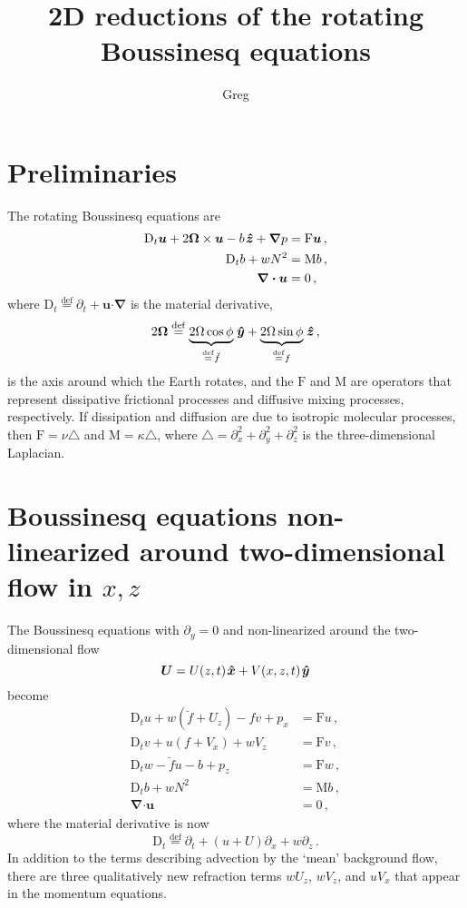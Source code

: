 \documentclass[12pt, oneside]{article}
\newcommand{\com}{\, ,}
\newcommand{\per}{\, .}
\newcommand{\defn}{\ensuremath{\stackrel{\mathrm{def}}{=}}}
\newcommand{\beq}{\begin{equation}}
\newcommand{\eeq}{\end{equation}}
\newcommand{\p}{\partial}
\newcommand{\bnabla}{\boldsymbol \nabla}
\newcommand{\bcdot}{\boldsymbol \cdot}
\newcommand{\lap}{\triangle}
\newcommand{\bu}{\boldsymbol u}
\newcommand{\bxh}{\hspace{0.1em} \boldsymbol{\hat x}}
\newcommand{\byh}{\hspace{0.1em}\boldsymbol{\hat y}}
\newcommand{\bzh}{\hspace{0.1em}\boldsymbol{\hat z}}
\newcommand{\bOmega}{\boldsymbol \Omega}
\newcommand{\bU}{\boldsymbol{U}}
\newcommand{\kap}{\kappa}
\newcommand{\Dt}[1]{\mathrm{D}_t #1}
\newcommand{\fh}{\breve f}
\newcommand{\friction}{\mathrm{F}}
\newcommand{\mixing}{\mathrm{M}}
\begin{document}
\title{\vspace{-4ex} 2D reductions of the rotating Boussinesq equations}
\author{Greg}
\date{} \maketitle \vspace{-4ex}

\section{Preliminaries}

The rotating Boussinesq equations are
\begin{align}
\Dt{\bu} + 2 \bOmega \times \bu - b \bzh + \bnabla p &= \friction \bu \com \label{mom} \\
\Dt{b} + w N^2 &= \mixing b \com \label{buoy} \\
\bnabla \bcdot \bu &= 0 \com \label{cont}
\end{align}
where $\Dt \defn \p_t + \bu \bcdot \bnabla$ is the material derivative, 
\beq
2 \bOmega \defn \underbrace{2 \Omega \cos \phi}_{\defn \fh} \byh + \underbrace{2 \Omega \sin \phi}_{\defn f} \bzh \com
\eeq
is the axis around which the Earth rotates, and the $\friction$ and $\mixing$ are operators that represent dissipative frictional processes and diffusive mixing processes, respectively. If dissipation and diffusion are due to isotropic molecular processes, then $\friction = \nu \lap$ and $\mixing = \kap \lap$, where $\lap = \p_x^2 + \p_y^2 + \p_z^2$ is the three-dimensional Laplacian. 

\section{Boussinesq equations non-linearized around two-dimensional flow in $x,z$}

The Boussinesq equations with $\p_y = 0$ and non-linearized around the two-dimensional flow 
\beq
\bU = U(z, t) \bxh + V(x, z, t) \byh
\eeq
become
\begin{align}
\Dt{u} + w \left ( \fh + U_z \right ) - f v  + p_x &= \friction u \com \\
\Dt{v} + u \left ( f + V_x \right ) + w V_z  &= \friction v \com \\
\Dt{w} - \fh u - b + p_z &= \friction w \com \\
\Dt{b} + w N^2 &= \mixing b \com \\
\bnabla \bcdot \bu &= 0 \com
\end{align}
where the material derivative is now
\beq
\Dt \defn \p_t + \left ( u + U \right ) \p_x + w \p_z \per
\eeq
In addition to the terms describing advection by the `mean' background flow, there are three qualitatively new refraction terms $w U_z$, $w V_z$, and $u V_x$ that appear in the momentum equations.
\end{document}
